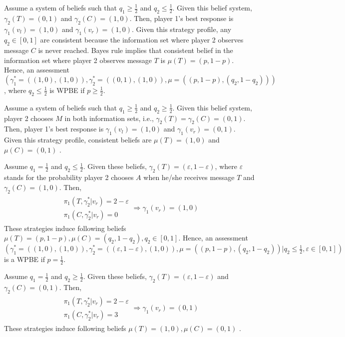 \documentclass[]{article}
\begin{document}
Assume a system of beliefs such that $q_1 \geq \frac{1}{2}$ and $q_2 \leq \frac{1}{2}$. Given this belief system, $\gamma_2(T) = (0, 1)$ and $\gamma_2(C) = (1, 0)$. Then, player 1's best response is $\gamma_1(v_l) = (1, 0)$ and $\gamma_1(v_r) = (1, 0)$. Given this strategy profile, any $q_2 \in [0, 1]$ are consistent because the information set where player 2 observes message $C$ is never reached. Bayes rule implies that consistent belief in the information set where player 2 observes message $T$ is $\mu(T) = (p, 1 - p)$. Hence, an assessment $(\gamma_1^* = ((1, 0), (1, 0)), \gamma_2^* = ((0, 1), (1, 0)), \mu = ((p, 1 - p), (q_2, 1 - q_2)))$, where $q_2\leq\frac{1}{2}$ is WPBE if $p\geq\frac{1}{2}$.

Assume a system of beliefs such that $q_1 \geq \frac{1}{2}$ and $q_2 \geq \frac{1}{2}$. Given this belief system, player 2 chooses $M$ in both information sets, i.e., $\gamma_2(T) = \gamma_2(C) = (0, 1)$. Then, player 1's best response is $\gamma_1(v_l) = (1, 0)$ and $\gamma_1(v_r) = (0, 1)$. Given this strategy profile, consistent beliefs are $\mu(T) = (1, 0)$ and $\mu(C) = (0, 1)$ \Lightning.

Assume $q_1 = \frac{1}{2}$ and $q_2 \leq \frac{1}{2}$. Given these beliefs, $\gamma_2(T) = (\varepsilon, 1 - \varepsilon)$, where $\varepsilon$ stands for the probability player 2 chooses $A$ when he/she receives message $T$ and $\gamma_2(C) = (1, 0)$. Then,
\begin{equation}
	\begin{split}
		\begin{matrix}
			\pi_1(T, \gamma_2^*|v_r) = 2 - \varepsilon \\ \nonumber
			\pi_1(C, \gamma_2^*|v_r) = 0
		\end{matrix} \Rightarrow \gamma_1(v_r) = (1, 0)
	\end{split}
\end{equation}
These strategies induce following beliefs $\mu(T) = (p, 1 - p), \mu(C) = (q_2, 1 - q_2), q_2\in [0, 1]$. Hence, an assessment $(\gamma_1^* = ((1, 0), (1, 0)), \gamma_2^* = ((\varepsilon, 1 - \varepsilon), (1, 0)), \mu = ((p, 1 - p), (q_2, 1 - q_2))| q_2\leq\frac{1}{2}, \varepsilon\in[0, 1])$ is a WPBE if $p = \frac{1}{2}$.

Assume $q_1 = \frac{1}{2}$ and $q_2 \geq \frac{1}{2}$. Given these beliefs, $\gamma_2(T) = (\varepsilon, 1 - \varepsilon)$ and $\gamma_2(C) = (0, 1)$. Then,
\begin{equation}
	\begin{split}
		\begin{matrix}
			\pi_1(T, \gamma_2^*|v_r) = 2 - \varepsilon \\ \nonumber
			\pi_1(C, \gamma_2^*|v_r) = 3
		\end{matrix} \Rightarrow \gamma_1(v_r) = (0, 1)
	\end{split}
\end{equation}
These strategies induce following beliefs $\mu(T) = (1, 0), \mu(C) = (0, 1)$ \Lightning.
\end{document}
